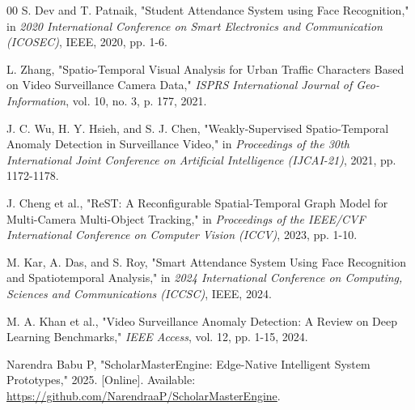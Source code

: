 \documentclass[conference]{IEEEtran}
\begin{document}
\begin{thebibliography}{00}
 S. Dev and T. Patnaik, "Student Attendance System using Face Recognition," in \textit{2020 International Conference on Smart Electronics and Communication (ICOSEC)}, IEEE, 2020, pp. 1-6.

 L. Zhang, "Spatio-Temporal Visual Analysis for Urban Traffic Characters Based on Video Surveillance Camera Data," \textit{ISPRS International Journal of Geo-Information}, vol. 10, no. 3, p. 177, 2021.

 J. C. Wu, H. Y. Hsieh, and S. J. Chen, "Weakly-Supervised Spatio-Temporal Anomaly Detection in Surveillance Video," in \textit{Proceedings of the 30th International Joint Conference on Artificial Intelligence (IJCAI-21)}, 2021, pp. 1172-1178.

 J. Cheng et al., "ReST: A Reconfigurable Spatial-Temporal Graph Model for Multi-Camera Multi-Object Tracking," in \textit{Proceedings of the IEEE/CVF International Conference on Computer Vision (ICCV)}, 2023, pp. 1-10.

 M. Kar, A. Das, and S. Roy, "Smart Attendance System Using Face Recognition and Spatiotemporal Analysis," in \textit{2024 International Conference on Computing, Sciences and Communications (ICCSC)}, IEEE, 2024.


 M. A. Khan et al., "Video Surveillance Anomaly Detection: A Review on Deep Learning Benchmarks," \textit{IEEE Access}, vol. 12, pp. 1-15, 2024.


 Narendra Babu P, "ScholarMasterEngine: Edge-Native Intelligent System Prototypes," 2025. [Online]. Available: \url{https://github.com/NarendraaP/ScholarMasterEngine}.

\end{thebibliography}
\end{document}
